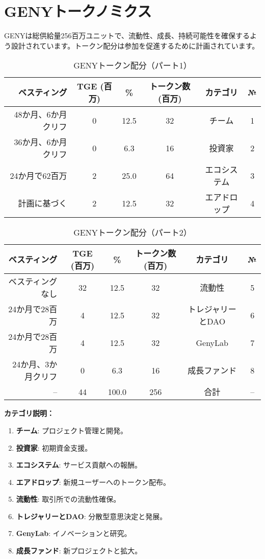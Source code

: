 \documentclass[a4paper,12pt,openany]{book}
\begin{document}
\section*{GENYトークノミクス}
GENYは総供給量256百万ユニットで、流動性、成長、持続可能性を確保するよう設計されています。トークン配分は参加を促進するために計画されています。

\begin{table}[h]
\centering
\caption{GENYトークン配分（パート1）}
\small
\begin{tabular}{r c c c c c}
\hline
\textbf{ベスティング} & \textbf{TGE (百万)} & \textbf{\%} & \textbf{トークン数 (百万)} & \textbf{カテゴリ} & \textbf{№} \\
\hline
48か月、6か月クリフ & 0 & 12.5 & 32 & チーム & 1 \\
36か月、6か月クリフ & 0 & 6.3 & 16 & 投資家 & 2 \\
24か月で62百万 & 2 & 25.0 & 64 & エコシステム & 3 \\
計画に基づく & 2 & 12.5 & 32 & エアドロップ & 4 \\
\hline
\end{tabular}
\end{table}

\begin{table}[h]
\centering
\caption{GENYトークン配分（パート2）}
\small
\begin{tabular}{r c c c c c}
\hline
\textbf{ベスティング} & \textbf{TGE (百万)} & \textbf{\%} & \textbf{トークン数 (百万)} & \textbf{カテゴリ} & \textbf{№} \\
\hline
ベスティングなし & 32 & 12.5 & 32 & 流動性 & 5 \\
24か月で28百万 & 4 & 12.5 & 32 & トレジャリーとDAO & 6 \\
24か月で28百万 & 4 & 12.5 & 32 & GenyLab & 7 \\
24か月、3か月クリフ & 0 & 6.3 & 16 & 成長ファンド & 8 \\
\hline
-- & 44 & 100.0 & 256 & 合計 & -- \\
\hline
\end{tabular}
\end{table}

\textbf{カテゴリ説明：}
\begin{enumerate}
    \item \textbf{チーム}: プロジェクト管理と開発。
    \item \textbf{投資家}: 初期資金支援。
    \item \textbf{エコシステム}: サービス貢献への報酬。
    \item \textbf{エアドロップ}: 新規ユーザーへのトークン配布。
    \item \textbf{流動性}: 取引所での流動性確保。
    \item \textbf{トレジャリーとDAO}: 分散型意思決定と発展。
    \item \textbf{GenyLab}: イノベーションと研究。
    \item \textbf{成長ファンド}: 新プロジェクトと拡大。
\end{enumerate}
\end{document}
